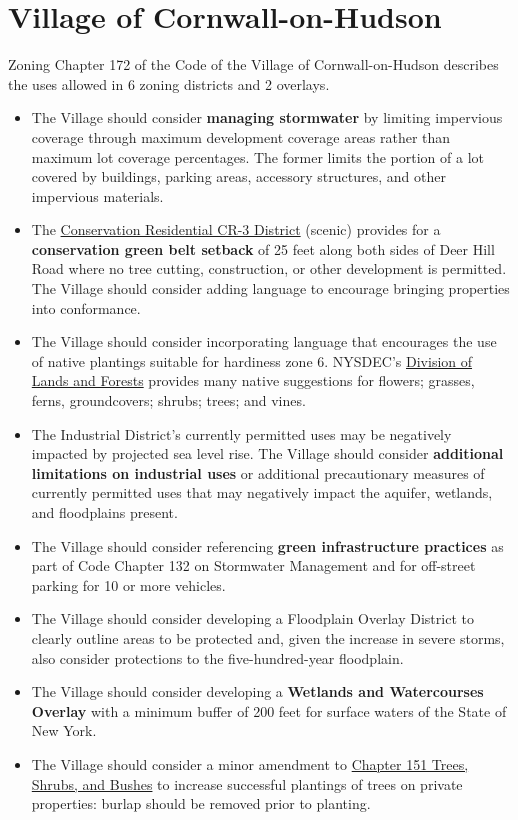 
\label{map:townzoning}

\section{Village of Cornwall-on-Hudson}
Zoning Chapter 172 of the Code of the Village of Cornwall-on-Hudson describes 
the uses allowed in 6 zoning districts and 2 overlays.
\begin{itemize}
    \item The Village should consider \textbf{managing stormwater} by limiting 
    impervious coverage through maximum development coverage areas rather than 
    maximum lot coverage percentages. The former limits the portion of a lot 
    covered by buildings, parking areas, accessory structures, and other 
    impervious materials.
    \item The \href{https://ecode360.com/15451539}{Conservation Residential
    CR-3 District} (scenic) provides for a \textbf{conservation green belt setback}
    of 25 feet along both sides of Deer Hill Road where no tree cutting,
    construction, or other development is permitted. The Village should
    consider adding language to encourage bringing properties into
    conformance.
    \item The Village should consider incorporating language that encourages
    the use of native plantings suitable for hardiness zone 6. NYSDEC’s
    \href{https://www.dec.ny.gov/docs/lands_forests_pdf/factnatives.pdf}{Division
    of Lands and Forests} provides many native suggestions for flowers;
    grasses, ferns, groundcovers; shrubs; trees; and vines.
    \item The Industrial District’s currently permitted uses may be negatively 
    impacted by projected sea level rise. The Village should consider 
    \textbf{additional limitations on industrial uses} or additional precautionary 
    measures of currently permitted uses that may negatively impact the 
    aquifer, wetlands, and floodplains present.
    \item The Village should consider referencing \textbf{green infrastructure 
    practices} as part of Code Chapter 132 on Stormwater Management and for 
    off-street parking for 10 or more vehicles.
    \item The Village should consider developing a Floodplain Overlay District 
    to clearly outline areas to be protected and, given the increase in severe 
    storms, also consider protections to the five-hundred-year floodplain.
    \item The Village should consider developing a \textbf{Wetlands and Watercourses 
    Overlay} with a minimum buffer of 200 feet for surface waters of the State of 
    New York.
    \item The Village should consider a minor amendment to \href{https://ecode360.com/15451101}{Chapter 151 Trees, 
    Shrubs, and Bushes} to increase successful plantings of trees on private 
    properties: burlap should be removed prior to planting.
\end{itemize}
\label{map:villagezoning}
